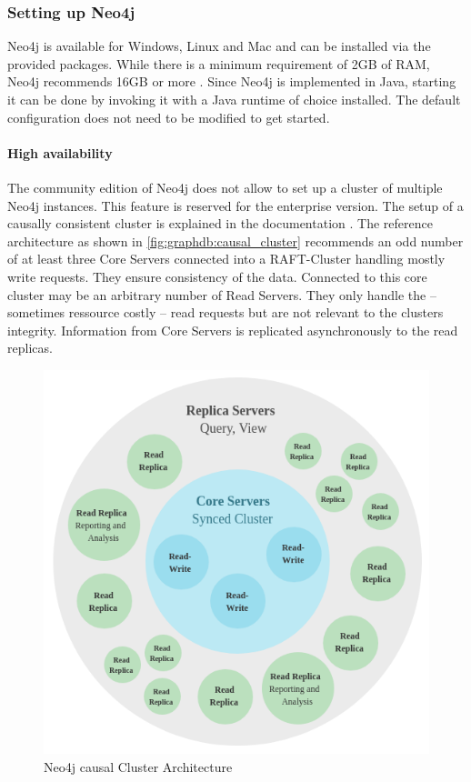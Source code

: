 \subsubsection{Setting up Neo4j}
Neo4j is available for Windows, Linux and Mac and can be installed via the provided packages. While there is a minimum requirement of 2GB of RAM, Neo4j recommends 16GB or more \autocite[Chapter~2.1]{neo4j:op_manual}.
Since Neo4j is implemented in Java, starting it can be done by invoking it with a Java runtime of choice installed. The default configuration does not need to be modified to get started.

\paragraph{High availability} \label{par:graphdb:ha} The community edition of Neo4j does not allow to set up a cluster of multiple Neo4j instances.
This feature is reserved for the enterprise version.
The setup of a causally consistent cluster is explained in the documentation \autocite[Chapter~5.1]{neo4j:op_manual}.
The reference architecture as shown in \autoref{fig:graphdb:causal_cluster} recommends an odd number of at least three \glqq Core Servers\grqq{} connected into a RAFT-Cluster handling mostly write requests.
They ensure consistency of the data.
Connected to this core cluster may be an arbitrary number of \glqq Read Servers\grqq.
They only handle the -- sometimes ressource costly -- read requests but are not relevant to the clusters integrity.
Information from Core Servers is replicated asynchronously to the read replicas.
\begin{figure}[ht]
    \centering
    \includegraphics[width=.5\textwidth]{img/causal_clustering.png}
    \caption{Neo4j causal Cluster Architecture \autocite[Chapter~5.1]{neo4j:op_manual}}
    \label{fig:graphdb:causal_cluster}
\end{figure}


